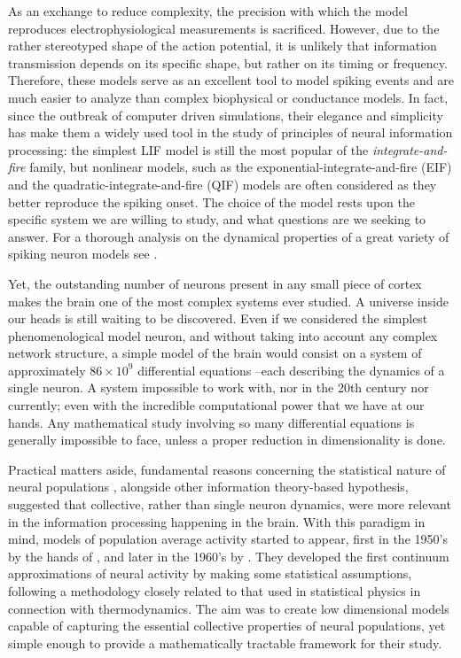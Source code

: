 As an exchange to reduce complexity, the precision with which the model reproduces
electrophysiological measurements is sacrificed. However, due to the
rather stereotyped shape of the action potential, it is unlikely that
information transmission depends on its specific shape, but rather on its timing or
frequency. Therefore, these models serve as an excellent tool to model
spiking events and are much easier to analyze than complex biophysical or
conductance models. In fact, since the outbreak of
computer driven simulations, their elegance and simplicity has make
them a widely used tool in the study of principles of neural
information processing: the simplest LIF model is still the most
popular of the \textit{integrate-and-fire} family, but nonlinear
models, such as the exponential-integrate-and-fire (EIF) \citep{Fourcaud-Trocme2003}  and the
quadratic-integrate-and-fire (QIF) \citep{Ermentrout1986,Ermentrout1996} models are often considered as they
better reproduce the spiking onset. The choice of the model rests upon
the specific system we are willing to study, and what questions are we
seeking to answer. For a thorough analysis on the dynamical
properties of a great variety of spiking neuron models see
\citet{Izhikevich2008}. 

Yet, the outstanding
number of neurons present in any small piece of cortex
makes the brain one of the most complex systems ever
studied. A universe inside our heads
is still waiting to be discovered.
Even if we considered the simplest phenomenological
model neuron, and without taking into account any
complex network structure, a simple model of the brain would consist on a system of approximately
$86\times 10^9$ differential equations --each describing the dynamics
of a single neuron. A system
impossible to work with, nor  in the  20th century nor currently; even with
the incredible computational power that we have at our hands. Any
mathematical study involving so many differential equations is
generally impossible to face, unless a proper reduction in
dimensionality is done.

Practical matters aside, fundamental reasons concerning the
statistical nature of neural populations \citep{Cragg1954}, alongside other information
theory-based hypothesis, suggested
that collective, rather than single neuron dynamics, were more relevant
in the information processing happening in the brain.    
With this paradigm in mind, models of population average activity started to appear, first
in the 1950's by the hands of \citet{Beu56}, and later in the 1960's by 
\citet{Griffith1963}. They developed the first continuum
approximations of neural activity by making some statistical
assumptions, following a methodology closely related to that used in
statistical physics in connection with
thermodynamics. The aim was to 
create low dimensional models capable of capturing the essential
collective properties of neural populations, yet simple enough to provide a
mathematically tractable framework for their study.

